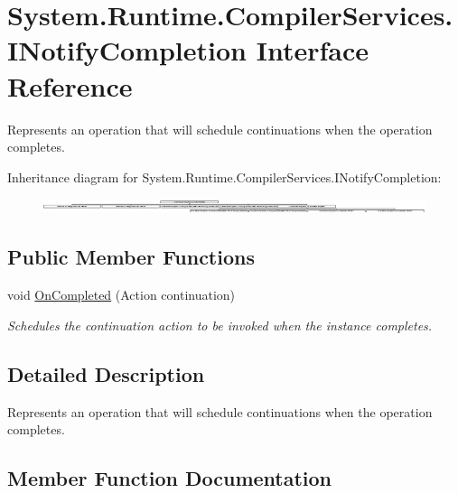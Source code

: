 \hypertarget{interface_system_1_1_runtime_1_1_compiler_services_1_1_i_notify_completion}{}\section{System.\+Runtime.\+Compiler\+Services.\+I\+Notify\+Completion Interface Reference}
\label{interface_system_1_1_runtime_1_1_compiler_services_1_1_i_notify_completion}


Represents an operation that will schedule continuations when the operation completes.  


Inheritance diagram for System.\+Runtime.\+Compiler\+Services.\+I\+Notify\+Completion\+:\begin{figure}[H]
\begin{center}
\leavevmode
\includegraphics[height=0.427807cm]{interface_system_1_1_runtime_1_1_compiler_services_1_1_i_notify_completion}
\end{center}
\end{figure}
\subsection*{Public Member Functions}
\begin{DoxyCompactItemize}
\item 
void \hyperlink{interface_system_1_1_runtime_1_1_compiler_services_1_1_i_notify_completion_ac999a22b9bc2d384bbef4d58db192efe}{On\+Completed} (Action continuation)
\begin{DoxyCompactList}\small\item\em Schedules the continuation action to be invoked when the instance completes.\end{DoxyCompactList}\end{DoxyCompactItemize}


\subsection{Detailed Description}
Represents an operation that will schedule continuations when the operation completes. 



\subsection{Member Function Documentation}
\mbox{\label{interface_system_1_1_runtime_1_1_compiler_services_1_1_i_notify_completion_ac999a22b9bc2d384bbef4d58db192efe}} 
